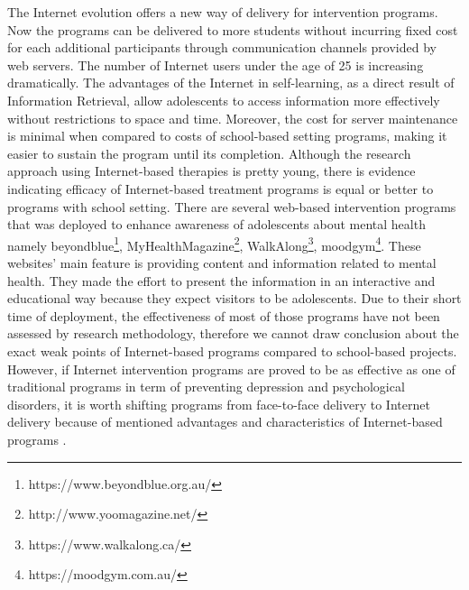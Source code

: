 The Internet evolution offers a new way of delivery for intervention programs. Now the programs can be delivered to more students without incurring fixed cost for each additional participants through communication channels provided by web servers. The number of Internet users under the age of 25 is increasing dramatically. The advantages of the Internet in self-learning, as a direct result of Information Retrieval, allow adolescents to access information more effectively without restrictions to space and time. Moreover, the cost for server maintenance is minimal when compared to costs of school-based setting programs, making it easier to sustain the program until its completion. Although the research approach using Internet-based therapies is pretty young, there is evidence indicating efficacy of Internet-based treatment programs is equal or better to programs with school setting. There are several web-based intervention programs that was deployed to enhance awareness of adolescents about mental health namely beyondblue\footnote{https://www.beyondblue.org.au/}, MyHealthMagazine\footnote{http://www.yoomagazine.net/}, WalkAlong\footnote{https://www.walkalong.ca/}, moodgym\footnote{https://moodgym.com.au/}. These websites' main feature is providing content and information related to mental health. They made the effort to present the information in an interactive and educational way because they expect visitors to be adolescents. Due to their short time of deployment, the effectiveness of most of those programs have not been assessed by research methodology, therefore we cannot draw conclusion about the exact weak points of Internet-based programs compared to school-based projects. However, if Internet intervention programs are proved to be as effective as one of traditional programs in term of preventing depression and psychological disorders, it is worth shifting programs from face-to-face delivery to Internet delivery because of mentioned advantages and characteristics of Internet-based programs \cite{Huen2016}.\\
